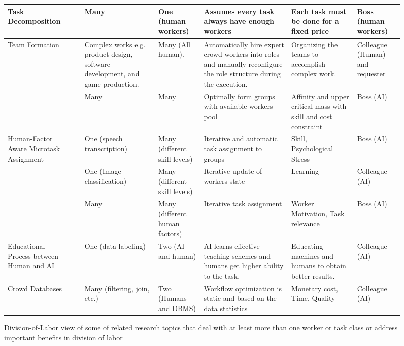 {\begin{figure}[t]
\begin{tabular}{|p{19mm}|p{10mm}|p{22mm}|p{18mm}|p{29mm}|p{30mm}|p{15mm}|}
\hline
Task Decomposition&\cite{KCH12} &Many&One (human workers)&Assumes every task always have enough workers&Each task must be done for a fixed price&Boss (human workers)\\
\hline
Team Formation &
\cite{VRT+17}
&Complex works e.g. product design, software development, and game production.
& Many (All human).
& Automatically hire expert crowd workers into roles and  manually reconfigure the role structure during the execution.
&Organizing the teams to accomplish complex work.
& Colleague (Human) and requester\\
\cline{2-7}
&\cite{RRT+19}&Many&Many&Optimally form groups with available workers pool&Affinity and upper critical mass with skill and cost constraint&Boss (AI)\\
\hline
Human-Factor Aware Microtask Assignment&
\cite{KMS+18}&One (speech transcription)&Many (different skill levels)&Iterative and automatic task assignment to groups&Skill, Psychological Stress&Boss (AI)\\
\cline{2-7}
&\cite{SBB+14}&One (Image classification)& Many (different skill levels) & Iterative update of workers state& Learning &Colleague (AI)\\
\cline{2-7}
&\cite{PAS+18}&Many&Many (different human factors)&Iterative task assignment&Worker Motivation, Task relevance & Boss (AI)\\

\hline
Educational Process between Human and AI & \cite{YXG18,LDH+17,FZL+12,JAB15} & One (data labeling) & Two (AI and human) & AI learns effective teaching schemes and humans get higher ability to the task. & Educating machines and humans to obtain better results. & Colleague (AI)\\
\hline
Crowd Databases &\cite{FKK+11, PPG+12}& Many (filtering, join, etc.) & Two (Humans and DBMS) & Workflow optimization is static and based on the data statistics& Monetary cost, Time, Quality&Colleague (AI)\\
\hline
\end{tabular}
    \caption{Division-of-Labor view of some of  related  research topics that deal with at least more than one worker  or task class or address important benefits in division of labor}
    \label{fig:relatedwork}
\end{figure}
}

